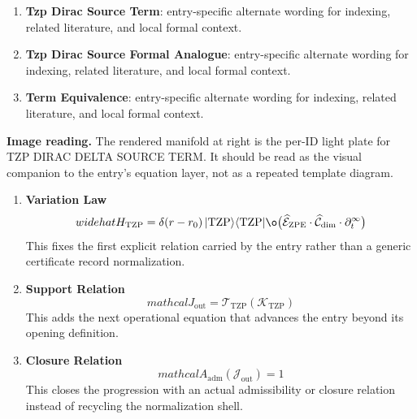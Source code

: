 \begin{enumerate}[leftmargin=1.6em,itemsep=6pt,topsep=4pt]
\item \textbf{Tzp Dirac Source Term}: entry-specific alternate wording for indexing, related literature, and local formal context.
\item \textbf{Tzp Dirac Source Formal Analogue}: entry-specific alternate wording for indexing, related literature, and local formal context.
\item \textbf{Term Equivalence}: entry-specific alternate wording for indexing, related literature, and local formal context.
\end{enumerate}

\begin{samepage}
\noindent\begin{minipage}[t]{0.45\linewidth}
\vspace{0pt}
\raggedright
\scriptsize\textbf{Image reading.} The rendered manifold at right is the per-ID light plate for TZP DIRAC DELTA SOURCE TERM. It should be read as the visual companion to the entry's equation layer, not as a repeated template diagram.\par
\end{minipage}\hfill
\begin{minipage}[t]{0.53\linewidth}
\vspace*{-0.10in}
\raggedright
{}
\end{minipage}
\end{samepage}

\clearpage


\begin{enumerate}[leftmargin=1.6em,itemsep=9pt,topsep=6pt]
\item \textbf{Variation Law}
\[
widehat{H}_{\mathrm{TZP}} = \delta(r - r_{0})\, \lvert \mathrm{TZP} \rangle \langle \mathrm{TZP} \rvert \o\bigl( \widehat{\mathcal{E}}_{\mathrm{ZPE}} \cdot \widehat{\mathcal{C}}_{\mathrm{dim}} \cdot \partial_{t}^{\infty} \bigr)
\]
This fixes the first explicit relation carried by the entry rather than a generic certificate record normalization.

\item \textbf{Support Relation}
\[
mathcal{J}_{\mathrm{out}} = \mathcal{T}_{\mathrm{TZP}}\!\left(\mathcal{K}_{\mathrm{TZP}}\right)
\]
This adds the next operational equation that advances the entry beyond its opening definition.

\item \textbf{Closure Relation}
\[
mathcal{A}_{\mathrm{adm}}\!\left(\mathcal{J}_{\mathrm{out}}\right)=1
\]
This closes the progression with an actual admissibility or closure relation instead of recycling the normalization shell.
\end{enumerate}

